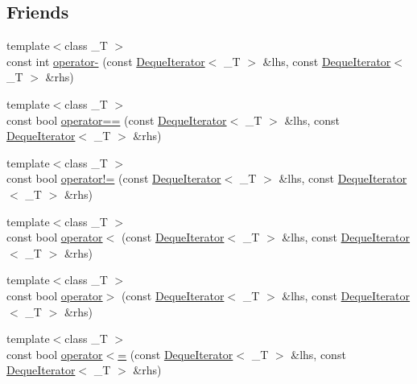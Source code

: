 \subsection*{Friends}
\begin{DoxyCompactItemize}
\item 
{\footnotesize template$<$class \+\_\+T $>$ }\\const int \hyperlink{classprism_1_1containers_1_1_deque_iterator_a18261ed6566d556f0c93c8bb014b42ab}{operator-\/} (const \hyperlink{classprism_1_1containers_1_1_deque_iterator}{Deque\+Iterator}$<$ \+\_\+T $>$ \&lhs, const \hyperlink{classprism_1_1containers_1_1_deque_iterator}{Deque\+Iterator}$<$ \+\_\+T $>$ \&rhs)
\item 
{\footnotesize template$<$class \+\_\+T $>$ }\\const bool \hyperlink{classprism_1_1containers_1_1_deque_iterator_a522cd7451923ab14887bc7fb3852900b}{operator==} (const \hyperlink{classprism_1_1containers_1_1_deque_iterator}{Deque\+Iterator}$<$ \+\_\+T $>$ \&lhs, const \hyperlink{classprism_1_1containers_1_1_deque_iterator}{Deque\+Iterator}$<$ \+\_\+T $>$ \&rhs)
\item 
{\footnotesize template$<$class \+\_\+T $>$ }\\const bool \hyperlink{classprism_1_1containers_1_1_deque_iterator_a0f6f2e5bcabc70c70738cd87223fe33f}{operator!=} (const \hyperlink{classprism_1_1containers_1_1_deque_iterator}{Deque\+Iterator}$<$ \+\_\+T $>$ \&lhs, const \hyperlink{classprism_1_1containers_1_1_deque_iterator}{Deque\+Iterator}$<$ \+\_\+T $>$ \&rhs)
\item 
{\footnotesize template$<$class \+\_\+T $>$ }\\const bool \hyperlink{classprism_1_1containers_1_1_deque_iterator_a994fd8746a39f56be113488806c8f802}{operator$<$} (const \hyperlink{classprism_1_1containers_1_1_deque_iterator}{Deque\+Iterator}$<$ \+\_\+T $>$ \&lhs, const \hyperlink{classprism_1_1containers_1_1_deque_iterator}{Deque\+Iterator}$<$ \+\_\+T $>$ \&rhs)
\item 
{\footnotesize template$<$class \+\_\+T $>$ }\\const bool \hyperlink{classprism_1_1containers_1_1_deque_iterator_ac4a837da18f5f6441c35a661e5698959}{operator$>$} (const \hyperlink{classprism_1_1containers_1_1_deque_iterator}{Deque\+Iterator}$<$ \+\_\+T $>$ \&lhs, const \hyperlink{classprism_1_1containers_1_1_deque_iterator}{Deque\+Iterator}$<$ \+\_\+T $>$ \&rhs)
\item 
{\footnotesize template$<$class \+\_\+T $>$ }\\const bool \hyperlink{classprism_1_1containers_1_1_deque_iterator_a55611a2a7410f770d3ce880dc308ebfa}{operator$<$=} (const \hyperlink{classprism_1_1containers_1_1_deque_iterator}{Deque\+Iterator}$<$ \+\_\+T $>$ \&lhs, const \hyperlink{classprism_1_1containers_1_1_deque_iterator}{Deque\+Iterator}$<$ \+\_\+T $>$ \&rhs)

\end{DoxyCompactItemize}
